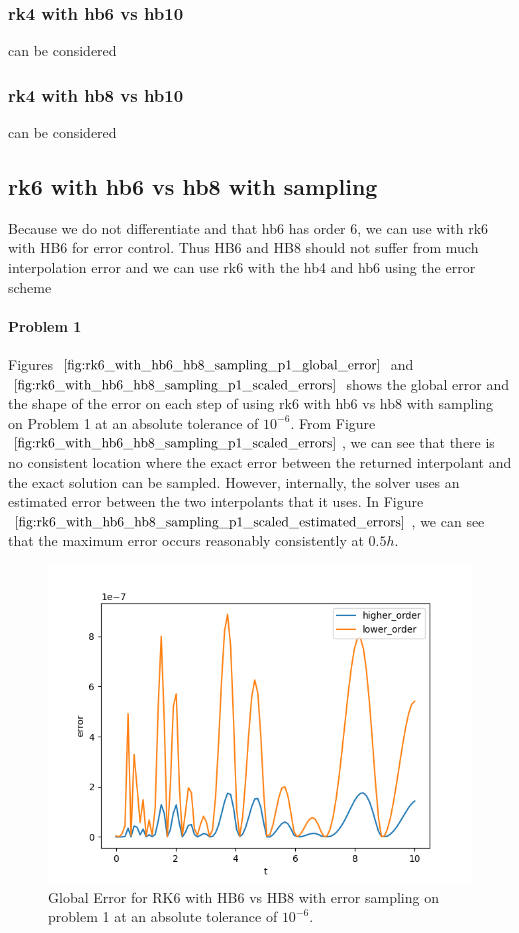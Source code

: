 \subsubsection{rk4 with hb6 vs hb10}
can be considered
\subsubsection{rk4 with hb8 vs hb10}
can be considered

\subsection{rk6 with hb6 vs hb8 with sampling}
Because we do not differentiate and that hb6 has order 6, we can use with rk6 with HB6 for error control. Thus HB6 and HB8 should not suffer from much interpolation error and we can use rk6 with the hb4 and hb6 using the error scheme

\paragraph{Problem 1} Figures $\ref{fig:rk6_with_hb6_hb8_sampling_p1_global_error}$ and $\ref{fig:rk6_with_hb6_hb8_sampling_p1_scaled_errors}$ shows the global error and the shape of the error on each step of using rk6 with hb6 vs hb8 with sampling on Problem 1 at an absolute tolerance of $10^{-6}$. From Figure $\ref{fig:rk6_with_hb6_hb8_sampling_p1_scaled_errors}$, we can see that there is no consistent location where the exact error between the returned interpolant and the exact solution can be sampled. However, internally, the solver uses an estimated error between the two interpolants that it uses. In Figure $\ref{fig:rk6_with_hb6_hb8_sampling_p1_scaled_estimated_errors}$, we can see that the maximum error occurs reasonably consistently at $0.5h$.

\begin{figure}[H]
\centering
\includegraphics[width=0.7\linewidth]{./figures/rk6_with_hb6_hb8_sampling_p1_global_error}
\caption{Global Error for RK6 with HB6 vs HB8 with error sampling on problem 1 at an absolute tolerance of $10^{-6}$.}
\label{fig:rk6_with_hb6_hb8_sampling_p1_global_error}
\end{figure}

